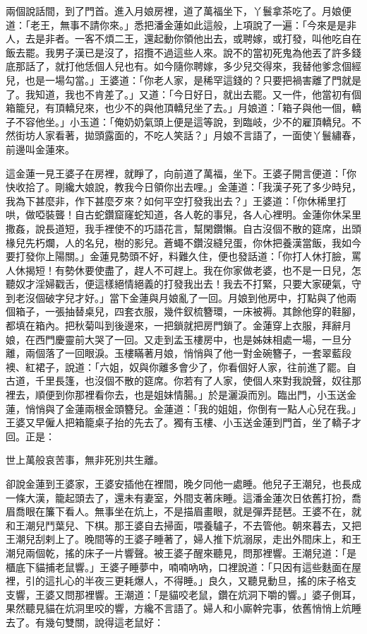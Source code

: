 兩個說話間，到了門首。進入月娘房裡，道了萬福坐下，丫鬟拿茶吃了。月娘便道：「老王，無事不請你來。」悉把潘金蓮如此這般，上項說了一遍：「今來是是非人，去是非者。一客不煩二王，還起動你領他出去，或聘嫁，或打發，叫他吃自在飯去罷。我男子漢已是沒了，招攬不過這些人來。說不的當初死鬼為他丟了許多錢底那話了，就打他恁個人兒也有。如今隨你聘嫁，多少兒交得來，我替他爹念個經兒，也是一場勾當。」王婆道：「你老人家，是稀罕這錢的？只要把禍害離了門就是了。我知道，我也不肯差了。」又道：「今日好日，就出去罷。又一件，他當初有個箱籠兒，有頂轎兒來，也少不的與他頂轎兒坐了去。」月娘道：「箱子與他一個，轎子不容他坐。」小玉道：「俺奶奶氣頭上便是這等說，到臨岐，少不的雇頂轎兒。不然街坊人家看著，拋頭露面的，不吃人笑話？」月娘不言語了，一面使丫鬟繡春，前邊叫金蓮來。

這金蓮一見王婆子在房裡，就睜了，向前道了萬福，坐下。王婆子開言便道：「你快收拾了。剛纔大娘說，教我今日領你出去哩。」金蓮道：「我漢子死了多少時兒，我為下甚麼非，作下甚麼歹來？如何平空打發我出去？」王婆道：「你休稀里打哄，做啞裝聾！自古蛇鑽窟窿蛇知道，各人乾的事兒，各人心裡明。金蓮你休呆里撒姦，說長道短，我手裡使不的巧語花言，幫閑鑽懶。自古沒個不散的筵席，出頭椽兒先朽爛，人的名兒，樹的影兒。蒼蠅不鑽沒縫兒蛋，你休把養漢當飯，我如今要打發你上陽關。」金蓮見勢頭不好，料難久住，便也發話道：「你打人休打臉，罵人休揭短！有勢休要使盡了，趕人不可趕上。我在你家做老婆，也不是一日兒，怎聽奴才淫婦戳舌，便這樣絕情絕義的打發我出去！我去不打緊，只要大家硬氣，守到老沒個破字兒才好。」當下金蓮與月娘亂了一回。月娘到他房中，打點與了他兩個箱子，一張抽替桌兒，四套衣服，幾件釵梳簪環，一床被褥。其餘他穿的鞋腳，都填在箱內。把秋菊叫到後邊來，一把鎖就把房門鎖了。金蓮穿上衣服，拜辭月娘，在西門慶靈前大哭了一回。又走到孟玉樓房中，也是姊妹相處一場，一旦分離，兩個落了一回眼淚。玉樓瞞著月娘，悄悄與了他一對金碗簪子，一套翠藍段襖、紅裙子，說道：「六姐，奴與你離多會少了，你看個好人家，往前進了罷。自古道，千里長篷，也沒個不散的筵席。你若有了人家，使個人來對我說聲，奴往那裡去，順便到你那裡看你去，也是姐妹情腸。」於是灑淚而別。臨出門，小玉送金蓮，悄悄與了金蓮兩根金頭簪兒。金蓮道：「我的姐姐，你倒有一點人心兒在我。」王婆又早僱人把箱籠桌子抬的先去了。獨有玉樓、小玉送金蓮到門首，坐了轎子才回。正是：

世上萬般哀苦事，無非死別共生離。

卻說金蓮到王婆家，王婆安插他在裡間，晚夕同他一處睡。他兒子王潮兒，也長成一條大漢，籠起頭去了，還未有妻室，外間支著床睡。這潘金蓮次日依舊打扮，喬眉喬眼在簾下看人。無事坐在炕上，不是描眉畫眼，就是彈弄琵琶。王婆不在，就和王潮兒鬥葉兒、下棋。那王婆自去掃面，喂養驢子，不去管他。朝來暮去，又把王潮兒刮剌上了。晚間等的王婆子睡著了，婦人推下炕溺尿，走出外間床上，和王潮兒兩個乾，搖的床子一片響聲。被王婆子醒來聽見，問那裡響。王潮兒道：「是櫃底下貓捕老鼠響。」王婆子睡夢中，喃喃吶吶，口裡說道：「只因有這些麩面在屋裡，引的這扎心的半夜三更耗爆人，不得睡。」良久，又聽見動旦，搖的床子格支支響，王婆又問那裡響。王潮道：「是貓咬老鼠，鑽在炕洞下嚼的響。」婆子側耳，果然聽見貓在炕洞里咬的響，方纔不言語了。婦人和小廝幹完事，依舊悄悄上炕睡去了。有幾句雙關，說得這老鼠好：


